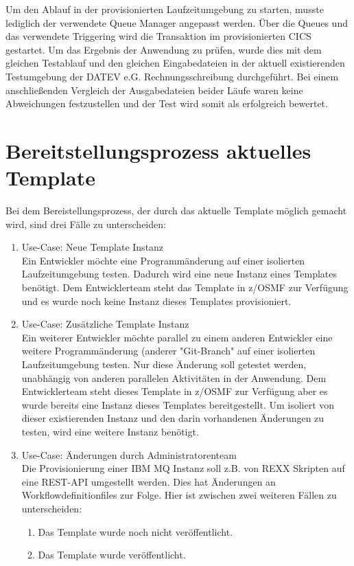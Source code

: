 Um den Ablauf in der provisionierten Laufzeitumgebung zu starten, musste lediglich der verwendete Queue Manager angepasst werden.
Über die Queues und das verwendete Triggering wird die Transaktion im provisionierten CICS gestartet.
Um das Ergebnis der Anwendung zu prüfen, wurde dies mit dem gleichen Testablauf und den gleichen Eingabedateien in der aktuell existierenden Testumgebung der DATEV e.G. Rechnungsschreibung durchgeführt.
Bei einem anschließenden Vergleich der Ausgabedateien beider Läufe waren keine Abweichungen festzustellen und der Test wird somit als erfolgreich bewertet.

\section{Bereitstellungsprozess aktuelles Template}\label{sec:akttemp}
Bei dem Bereistellungsprozess, der durch das aktuelle Template möglich gemacht wird, sind drei Fälle zu unterscheiden:

\begin{samepage}
\begin{enumerate}
\item Use-Case: Neue Template Instanz\\
Ein Entwickler möchte eine Programmänderung auf einer isolierten Laufzeitumgebung testen.
Dadurch wird eine neue Instanz eines Templates benötigt.
Dem Entwicklerteam steht das Template in z/OSMF zur Verfügung und es wurde noch keine Instanz dieses Templates provisioniert.

\item Use-Case: Zusätzliche Template Instanz\\
Ein weiterer Entwickler möchte parallel zu einem anderen Entwickler eine weitere  Programmänderung (anderer "Git-Branch" auf einer isolierten Laufzeitumgebung testen. 
Nur diese Änderung soll getestet werden, unabhängig von anderen parallelen Aktivitäten in der Anwendung. 
Dem Entwicklerteam steht dieses Template in z/OSMF zur Verfügung aber es wurde  bereits eine Instanz dieses Templates bereitgestellt. 
Um isoliert von dieser existierenden Instanz und den darin vorhandenen Änderungen zu testen, wird eine weitere Instanz benötigt.

\item Use-Case: Änderungen durch Administratorenteam\\
Die Provisionierung  einer IBM MQ Instanz soll z.B. von REXX Skripten auf eine REST-API umgestellt werden.
Dies hat Änderungen an Workflowdefinitionfiles zur Folge.
Hier ist zwischen zwei weiteren Fällen zu unterscheiden:
\begin{enumerate}
\item Das Template wurde noch nicht veröffentlicht.
\item Das Template wurde veröffentlicht.
\end{enumerate}
\end{enumerate}
\end{samepage}

